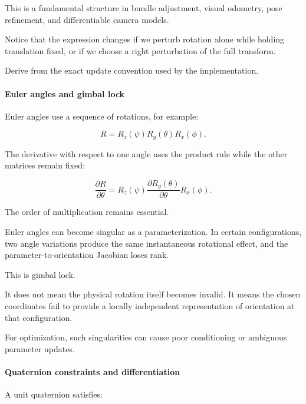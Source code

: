 This is a fundamental structure in bundle adjustment, visual odometry, pose refinement, and differentiable camera models.

Notice that the expression changes if we perturb rotation alone while holding translation fixed, or if we choose a right perturbation of the full transform.

Derive from the exact update convention used by the implementation.

\paragraph{Euler angles and gimbal lock}\label{02-foundations-ii-ch027-euler-angles-and-gimbal-lock}

\hypertarget{02-foundations-ii-ch027-euler-angles-and-gimbal-lock}{}

Euler angles use a sequence of rotations, for example:

\[
R=R_z(\psi)R_y(\theta)R_x(\phi).
\]

The derivative with respect to one angle uses the product rule while the other matrices remain fixed:

\[
\frac{\partial R}{\partial\theta} = R_z(\psi) \frac{\partial R_y(\theta)}{\partial\theta} R_x(\phi).
\]

The order of multiplication remains essential.

Euler angles can become singular as a parameterization. In certain configurations, two angle variations produce the same instantaneous rotational effect, and the parameter-to-orientation Jacobian loses rank.

This is gimbal lock.

It does not mean the physical rotation itself becomes invalid. It means the chosen coordinates fail to provide a locally independent representation of orientation at that configuration.

For optimization, such singularities can cause poor conditioning or ambiguous parameter updates.

\paragraph{Quaternion constraints and differentiation}\label{02-foundations-ii-ch027-quaternion-constraints-and-differentiation}

\hypertarget{02-foundations-ii-ch027-quaternion-constraints-and-differentiation}{}

A unit quaternion satisfies:

